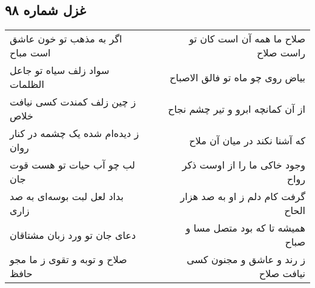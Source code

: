 \begin{center}
\section*{غزل شماره ۹۸}
\label{sec:sh098}
\begin{longtable}{l p{0.5cm} r}
اگر به مذهب تو خون عاشق است مباح
&&
صلاح ما همه آن است کان تو راست صلاح
\\
سواد زلف سیاه تو جاعل الظلمات
&&
بیاض روی چو ماه تو فالق الاصباح
\\
ز چین زلف کمندت کسی نیافت خلاص
&&
از آن کمانچه ابرو و تیر چشم نجاح
\\
ز دیده‌ام شده یک چشمه در کنار روان
&&
که آشنا نکند در میان آن ملاح
\\
لب چو آب حیات تو هست قوت جان
&&
وجود خاکی ما را از اوست ذکر رواح
\\
بداد لعل لبت بوسه‌ای به صد زاری
&&
گرفت کام دلم ز او به صد هزار الحاح
\\
دعای جان تو ورد زبان مشتاقان
&&
همیشه تا که بود متصل مسا و صباح
\\
صلاح و توبه و تقوی ز ما مجو حافظ
&&
ز رند و عاشق و مجنون کسی نیافت صلاح
\\
\end{longtable}
\end{center}
